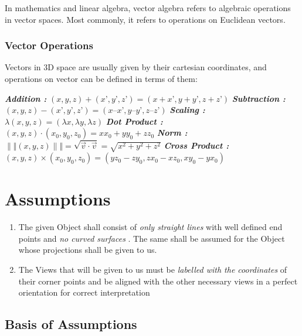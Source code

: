 \documentclass[12pt]{report}
\begin{document}
\hspace{1cm} In mathematics and linear algebra, vector algebra refers to algebraic operations in vector spaces. Most commonly, it refers to operations on Euclidean vectors.

\subsection{Vector Operations}

Vectors in 3D space are usually given by their cartesian coordinates, and operations on vector can be defined in terms of them:

\indent \textbf{\textit{Addition : }} $ (x, y, z) + (x’ , y’ ,z’) = (x + x’, y + y’, z + z’) $ 
\indent \textbf{\textit{Subtraction : }} $(x, y, z) − (x’ , y’ ,z’) = (x – x’ ,y – y’, z – z’)$ 
\indent \textbf{\textit{Scaling : }} $ \lambda (x, y, z) = (\lambda x, \lambda y, \lambda z)  $
\indent \textbf{\textit{Dot Product : }}$ (x, y, z) \cdot (x_{0} , y_{0} ,z_{0} ) = x x_{0} + y y_{0} + z z_{0} $
\indent \textbf{\textit{Norm : }} $ \|\Vert (x, y, z) \|\Vert = \sqrt{ \overrightarrow{v} · \overrightarrow{v} } = \sqrt{x^2 + y^2 + z^2} $
\indent \textbf{\textit{Cross Product : }} $ (x, y, z ) \times (x_{0} , y_{0} ,z_{0} ) = (yz_{0} − zy_{0} ,zx_{0} − xz_{0} , xy_{0} − yx_{0} ) $


\chapter{Assumptions}

\begin{enumerate}
    \item 
  The given Object shall consist of \textit{ only straight lines } with well defined end points and \textit{ no curved surfaces } . The same shall be assumed for the Object whose projections shall be given to us.
    \item 
  The Views that will be given to us must be \textit{ labelled with the coordinates } of their corner points and be aligned with the other necessary views in a perfect orientation for correct interpretation
\end{enumerate}

\section*{Basis of Assumptions}
\end{document}
